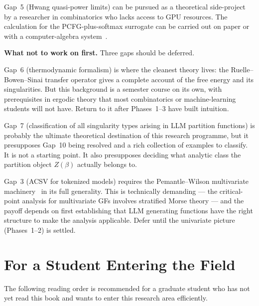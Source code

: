 Gap~5 (Hwang quasi-power limits) can be pursued as a theoretical
side-project by a researcher in combinatorics who lacks
access to GPU resources.  The calculation for the PCFG-plus-softmax
surrogate can be carried out on paper or with a computer-algebra
system~\cite{Hwang1998}.

\textbf{What not to work on first.}  Three gaps should be deferred.

Gap~6 (thermodynamic formalism) is where the cleanest theory lives:
the Ruelle--Bowen--Sinai transfer operator gives a complete account of
the free energy and its singularities.  But this background is a
semester course on its own, with prerequisites in ergodic theory that
most combinatorics or machine-learning students will not have.  Return
to it after Phases~1--3 have built intuition.

Gap~7 (classification of all singularity types arising in LLM partition
functions) is probably the ultimate theoretical destination of this
research programme, but it presupposes Gap~10 being resolved and a
rich collection of examples to classify.  It is not a starting point.
It also presupposes deciding what analytic class the partition object
$Z(\beta)$ actually belongs to.

Gap~3 (ACSV for tokenized models) requires the Pemantle--Wilson
multivariate machinery~\cite{PemantleWilson2013} in its full
generality.  This is technically demanding --- the critical-point
analysis for multivariate GFs involves stratified Morse theory ---
and the payoff depends on first establishing that LLM generating
functions have the right structure to make the analysis applicable.
Defer until the univariate picture (Phases~1--2) is settled.

\section{For a Student Entering the Field}
\label{ch19:student}

The following reading order is recommended for a graduate student
who has not yet read this book and wants to enter this research area
efficiently.

